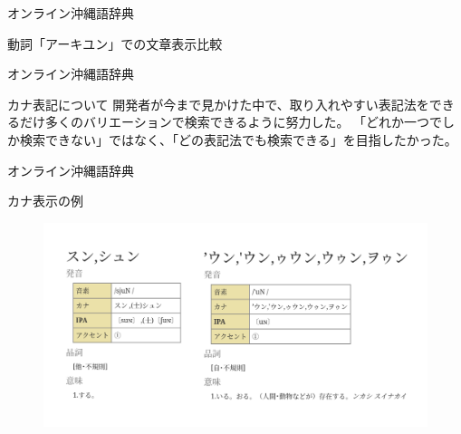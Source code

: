 \documentclass[14pt]{beamer}
\begin{document}
\begin{frame}{オンライン沖縄語辞典}
\begin{block}{動詞「アーキユン」での文章表示比較}
\begin{figure}[ht]
\begin{minipage}{0.5\textwidth}
      \end{minipage}
    \end{figure}
  \end{block}
\end{frame}


\begin{frame}{オンライン沖縄語辞典}
  \begin{block}{カナ表記について}
    \vspace{0pt}
    開発者が今まで見かけた中で、取り入れやすい表記法をできるだけ多くのバリエーションで検索できるように努力した。
    「どれか一つでしか検索できない」ではなく、「どの表記法でも検索できる」を目指したかった。
  \end{block}
\end{frame}

\begin{frame}{オンライン沖縄語辞典}
  \begin{block}{カナ表示の例}
    \begin{figure}[ht]
      \centering
        \includegraphics[height=0.6\paperheight,width=0.9\paperwidth]{okinawago-app-pronunciation-example2.png}
    \end{figure}
  \end{block}
\end{frame}
\end{document}
